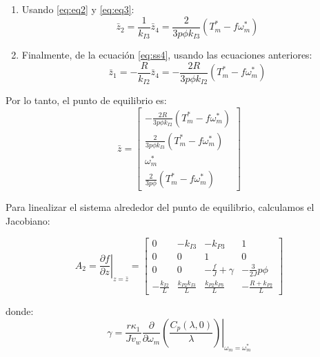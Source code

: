 {\begin{enumerate}
\item Usando \eqref{eq:eq2} y \eqref{eq:eq3}:
\begin{equation}
\bar{z}_2 = \frac{1}{k_{I3}}\bar{z}_4 = \frac{2}{3p\phi k_{I3}}(T^*_m - f\omega^*_m) \label{eq:eq4}
\end{equation}

\item Finalmente, de la ecuación \eqref{eq:ss4}, usando las ecuaciones anteriores:
\begin{equation}
\bar{z}_1 = -\frac{R}{k_{I2}}\bar{z}_4 = -\frac{2R}{3p\phi k_{I2}}(T^*_m - f\omega^*_m) \label{eq:eq5}
\end{equation}
\end{enumerate}

Por lo tanto, el punto de equilibrio es:
\begin{equation}
\bar{z} = \begin{bmatrix}
-\frac{2R}{3p\phi k_{I2}}(T^*_m - f\omega^*_m) \\[0.3cm]
\frac{2}{3p\phi k_{I3}}(T^*_m - f\omega^*_m) \\[0.3cm]
\omega^*_m \\[0.3cm]
\frac{2}{3p\phi}(T^*_m - f\omega^*_m)
\end{bmatrix} \label{eq:eq_point}
\end{equation}

Para linealizar el sistema alrededor del punto de equilibrio, calculamos el Jacobiano:

\begin{equation}
A_2 = \left.\frac{\partial f}{\partial z}\right|_{z=\bar{z}} = \begin{bmatrix}
0 & -k_{I3} & -k_{P3} & 1 \\
0 & 0 & 1 & 0 \\
0 & 0 & -\frac{f}{J} + \gamma & -\frac{3}{2J}p\phi \\
-\frac{k_{I2}}{L} & \frac{k_{P2}k_{I3}}{L} & \frac{k_{P2}k_{P3}}{L} & -\frac{R+k_{P2}}{L}
\end{bmatrix} \label{eq:A2_symbolic}
\end{equation}

donde:
\begin{equation}
\gamma = \frac{r\kappa_1}{Jv_w}\left.\frac{\partial}{\partial \omega_m}\left(\frac{C_p(\lambda, 0)}{\lambda}\right)\right|_{\omega_m=\omega^*_m} \label{eq:gamma}
\end{equation}

}
